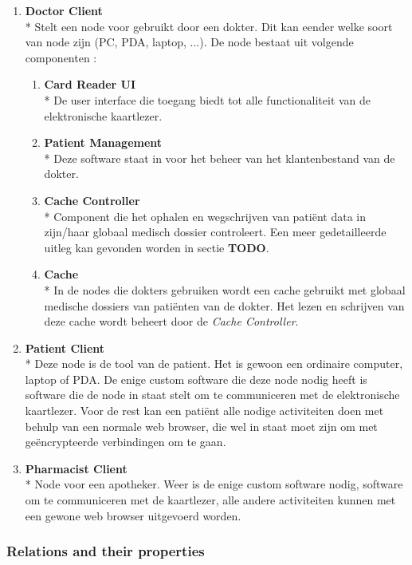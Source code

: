 \documentclass[a4paper,10pt]{article}
\begin{document}
\begin{enumerate}
\item \textbf{Doctor Client}\\*
Stelt een node voor gebruikt door een dokter. Dit kan eender welke soort van node zijn (PC, PDA, laptop, ...). De node bestaat uit volgende componenten : 
\begin{enumerate}
 \item \textbf{Card Reader UI}\\*
De user interface die toegang biedt tot alle functionaliteit van de elektronische kaartlezer.
\item \textbf{Patient Management}\\*
Deze software staat in voor het beheer van het klantenbestand van de dokter.
\item \textbf{Cache Controller}\\*
Component die het ophalen en wegschrijven van patiënt data in zijn/haar globaal medisch dossier controleert. Een meer gedetailleerde uitleg kan gevonden worden in sectie \textbf{TODO}.
\item \textbf{Cache}\\*
In de nodes die dokters gebruiken wordt een cache gebruikt met globaal medische dossiers van patiënten van de dokter. Het lezen en schrijven van deze cache wordt beheert door de \textit{Cache Controller}.
\end{enumerate}

\item \textbf{Patient Client}\\*
Deze node is de tool van de patient. Het is gewoon een ordinaire computer, laptop of PDA. De enige custom software die deze node nodig heeft is software die de node in staat stelt om te communiceren met de elektronische kaartlezer. Voor de rest kan een patiënt alle nodige activiteiten doen met behulp van een normale web browser, die wel in staat moet zijn om met geëncrypteerde verbindingen om te gaan.

\item \textbf{Pharmacist Client}\\*
Node voor een apotheker. Weer is de enige custom software nodig, software om te communiceren met de kaartlezer, alle andere activiteiten kunnen met een gewone web browser uitgevoerd worden.

\end{enumerate}


\subsubsection{Relations and their properties}
\end{document}
